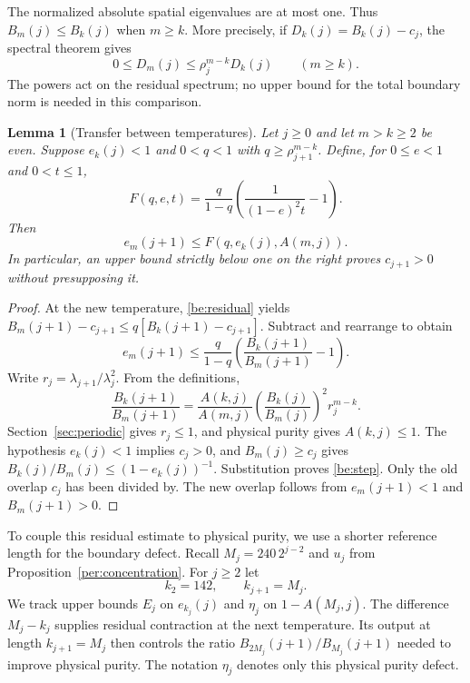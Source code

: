 \documentclass[11pt]{article}
\newtheorem{lemma}[theorem]{Lemma}
\theoremstyle{remark}
\numberwithin{equation}{section}
\begin{document}
The normalized absolute spatial eigenvalues are at most one. Thus
$B_m(j)\le B_k(j)$ when $m\ge k$. More precisely, if
$D_k(j)=B_k(j)-c_j$, the spectral theorem gives
\begin{equation}\label{be:residual}
 0\le D_m(j)\le\rho_j^{m-k}D_k(j)\qquad(m\ge k).
\end{equation}
The powers act on the residual spectrum; no upper bound for the total
boundary norm is needed in this comparison.

\begin{lemma}[Transfer between temperatures]\label{be:recurrence}
Let $j\ge0$ and let $m>k\ge2$ be even. Suppose $e_k(j)<1$ and
$0<q<1$ with $q\ge\rho_{j+1}^{m-k}$. Define, for
$0\le e<1$ and $0<t\le1$,
\begin{equation}\label{be:F}
 F(q,e,t)=\frac{q}{1-q}\left(\frac{1}{(1-e)^2t}-1\right).
\end{equation}
Then
\begin{equation}\label{be:step}
 e_m(j+1)\le F(q,e_k(j),A(m,j)).
\end{equation}
In particular, an upper bound strictly below one on the right proves
$c_{j+1}>0$ without presupposing it.
\end{lemma}
\begin{proof}
At the new temperature, \eqref{be:residual} yields
$B_m(j+1)-c_{j+1}\le q[B_k(j+1)-c_{j+1}]$.
Subtract and rearrange to obtain
\[
 e_m(j+1)\le\frac{q}{1-q}
                   \left(\frac{B_k(j+1)}{B_m(j+1)}-1\right).
\]
Write $r_j=\lambda_{j+1}/\lambda_j^2$. From the definitions,
\begin{equation}\label{be:ratio}
 \frac{B_k(j+1)}{B_m(j+1)}
 =\frac{A(k,j)}{A(m,j)}
   \left(\frac{B_k(j)}{B_m(j)}\right)^2 r_j^{m-k}.
\end{equation}
Section~\ref{sec:periodic} gives $r_j\le1$, and physical purity gives
$A(k,j)\le1$. The hypothesis $e_k(j)<1$ implies $c_j>0$, and
$B_m(j)\ge c_j$ gives
$B_k(j)/B_m(j)\le(1-e_k(j))^{-1}$.
Substitution proves \eqref{be:step}. Only the old overlap $c_j$ has
been divided by. The new overlap follows from
$e_m(j+1)<1$ and $B_m(j+1)>0$.
\end{proof}

To couple this residual estimate to physical purity, we use a shorter
reference length for the boundary defect. Recall $M_j=240\,2^{j-2}$ and
$u_j$ from Proposition~\ref{per:concentration}. For $j\ge2$ let
\begin{equation}\label{be:k}
 k_2=142,\qquad k_{j+1}=M_j.
\end{equation}
We track upper bounds $E_j$ on $e_{k_j}(j)$ and $\eta_j$ on
$1-A(M_j,j)$. The difference $M_j-k_j$ supplies residual contraction
at the next temperature. Its output at length $k_{j+1}=M_j$ then
controls the ratio $B_{2M_j}(j+1)/B_{M_j}(j+1)$ needed to improve
physical purity. The notation $\eta_j$ denotes only this physical
purity defect.
\end{document}

